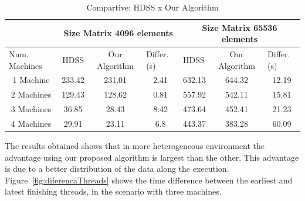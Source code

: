 \documentclass[journal]{IEEEtran}
\begin{document}
\begin{table}[h]
\centering
\tiny
\caption{Compartive: HDSS x Our Algorithm}

\begin{tabular}{c|c|c|c|c|c|c|}
\cline{2-7}
\multicolumn{1}{l|}{}                 & \multicolumn{3}{c|}{Size Matrix 4096 elements}                     & \multicolumn{3}{c|}{Size Matrix 65536 elements}                                       \\ \hline
\multicolumn{1}{|l|}{Num. Machines} & HDSS   & Our Algorithm & \multicolumn{1}{l|}{Differ. (s)} & \multicolumn{1}{l|}{HDSS} & Our Algorithm & \multicolumn{1}{l|}{Differ. (s)} \\ \hline
\multicolumn{1}{|c|}{1 Machine}       & 233.42 & 231.01        & 2.41                                 & 632.13                    & 644.32        & 12.19                               \\ \hline
\multicolumn{1}{|c|}{2 Machines}      & 129.43 & 128.62        & 0.81                                 & 557.92                    & 542.11        & 15.81                                 \\ \hline
\multicolumn{1}{|c|}{3 Machines}      & 36.85  & 28.43         & 8.42             
                   & 473.64                    & 452.41        &            21.23                          \\ \hline
\multicolumn{1}{|c|}{4 Machines}      & 29.91  & 23.11         & 6.8             
                   & 443.37                    & 383.28        &           60.09                          \\ \hline

\end{tabular}
\label{table: comparativo}
\end{table}


The results obtained shows that in more heterogeneous environment the advantage  using our proposed algorithm is largest than the other.
This advantage is due to a better distribution of the data along the
execution. Figure~\ref{fig:diferencaThreads} shows the time difference between
the earliest and latest finishing threads, in the scenario with three machines.
\end{document}
